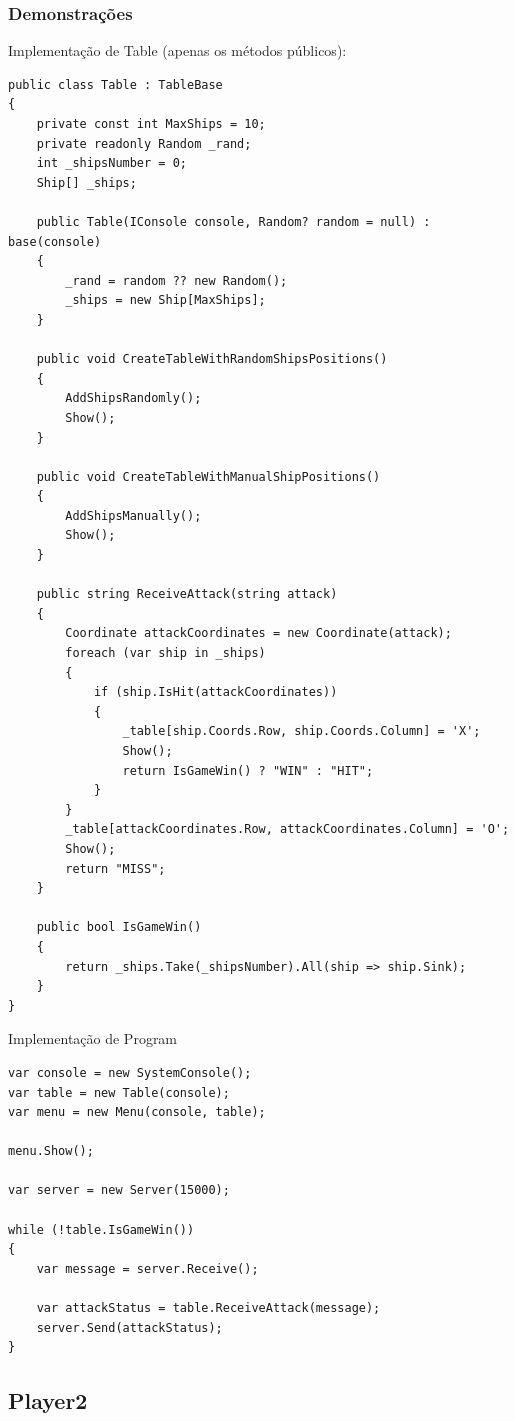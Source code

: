 \documentclass[
	12pt,				%
	oneside,			%
	a4paper,			%
	english,			%
	brazil,				%
	]{abntex2}
\begin{document}
{\subsubsection{Demonstrações}
Implementação de Table (apenas os métodos públicos):

\begin{lstlisting}
public class Table : TableBase
{
    private const int MaxShips = 10;
    private readonly Random _rand;
    int _shipsNumber = 0;
    Ship[] _ships;

    public Table(IConsole console, Random? random = null) : base(console)
    {
        _rand = random ?? new Random();
        _ships = new Ship[MaxShips];
    }

    public void CreateTableWithRandomShipsPositions()
    {
        AddShipsRandomly();
        Show();
    }

    public void CreateTableWithManualShipPositions()
    {
        AddShipsManually();
        Show();
    }

    public string ReceiveAttack(string attack)
    {
        Coordinate attackCoordinates = new Coordinate(attack);
        foreach (var ship in _ships)
        {
            if (ship.IsHit(attackCoordinates))
            {
                _table[ship.Coords.Row, ship.Coords.Column] = 'X';
                Show();
                return IsGameWin() ? "WIN" : "HIT";
            }
        }
        _table[attackCoordinates.Row, attackCoordinates.Column] = 'O';
        Show();
        return "MISS";
    }

    public bool IsGameWin()
    {
        return _ships.Take(_shipsNumber).All(ship => ship.Sink);
    }
}
\end{lstlisting}

Implementação de Program

\begin{lstlisting}
var console = new SystemConsole();
var table = new Table(console);
var menu = new Menu(console, table);

menu.Show();

var server = new Server(15000);

while (!table.IsGameWin())
{
    var message = server.Receive();

    var attackStatus = table.ReceiveAttack(message);
    server.Send(attackStatus);
}
\end{lstlisting}

\subsection{Player2}

}
\end{document}
